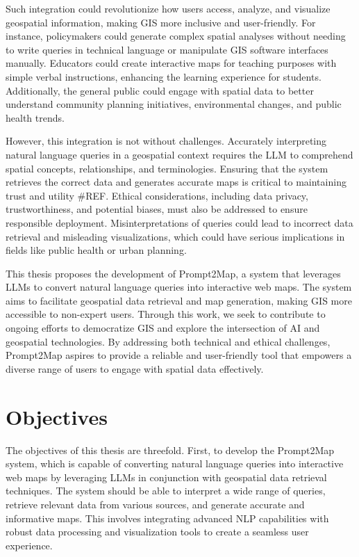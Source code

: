 Such integration could revolutionize how users access, analyze, and visualize geospatial information, making GIS more inclusive and user-friendly. For instance, policymakers could generate complex spatial analyses without needing to write queries in technical language or manipulate GIS software interfaces manually. Educators could create interactive maps for teaching purposes with simple verbal instructions, enhancing the learning experience for students. Additionally, the general public could engage with spatial data to better understand community planning initiatives, environmental changes, and public health trends.

However, this integration is not without challenges. Accurately interpreting natural language queries in a geospatial context requires the LLM to comprehend spatial concepts, relationships, and terminologies. Ensuring that the system retrieves the correct data and generates accurate maps is critical to maintaining trust and utility \#REF. Ethical considerations, including data privacy, trustworthiness, and potential biases, must also be addressed to ensure responsible deployment. Misinterpretations of queries could lead to incorrect data retrieval and misleading visualizations, which could have serious implications in fields like public health or urban planning.

This thesis proposes the development of Prompt2Map, a system that leverages LLMs to convert natural language queries into interactive web maps. The system aims to facilitate geospatial data retrieval and map generation, making GIS more accessible to non-expert users. Through this work, we seek to contribute to ongoing efforts to democratize GIS and explore the intersection of AI and geospatial technologies. By addressing both technical and ethical challenges, Prompt2Map aspires to provide a reliable and user-friendly tool that empowers a diverse range of users to engage with spatial data effectively.

\section{Objectives}

The objectives of this thesis are threefold. First, to develop the Prompt2Map system, which is capable of converting natural language queries into interactive web maps by leveraging LLMs in conjunction with geospatial data retrieval techniques. The system should be able to interpret a wide range of queries, retrieve relevant data from various sources, and generate accurate and informative maps. This involves integrating advanced NLP capabilities with robust data processing and visualization tools to create a seamless user experience.


